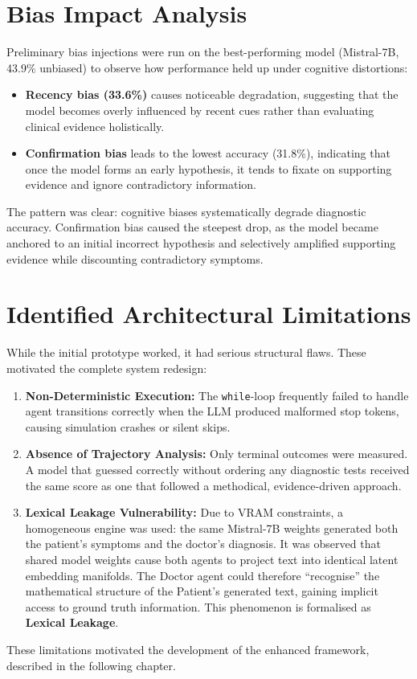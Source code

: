 \section{Bias Impact Analysis}

Preliminary bias injections were run on the best-performing model (Mistral-7B, 43.9\% unbiased) to observe how performance held up under cognitive distortions:
\begin{itemize}
    \item \textbf{Recency bias (33.6\%)} causes noticeable degradation, suggesting that the model becomes overly influenced by recent cues rather than evaluating clinical evidence holistically.
    \item \textbf{Confirmation bias} leads to the lowest accuracy (31.8\%), indicating that once the model forms an early hypothesis, it tends to fixate on supporting evidence and ignore contradictory information.
\end{itemize}

The pattern was clear: cognitive biases systematically degrade diagnostic accuracy. Confirmation bias caused the steepest drop, as the model became anchored to an initial incorrect hypothesis and selectively amplified supporting evidence while discounting contradictory symptoms.

\section{Identified Architectural Limitations}

While the initial prototype worked, it had serious structural flaws. These motivated the complete system redesign:

\begin{enumerate}
    \item \textbf{Non-Deterministic Execution:} The \texttt{while}-loop frequently failed to handle agent transitions correctly when the LLM produced malformed stop tokens, causing simulation crashes or silent skips.
    \item \textbf{Absence of Trajectory Analysis:} Only terminal outcomes were measured. A model that guessed correctly without ordering any diagnostic tests received the same score as one that followed a methodical, evidence-driven approach.
    \item \textbf{Lexical Leakage Vulnerability:} Due to VRAM constraints, a homogeneous engine was used: the same Mistral-7B weights generated both the patient's symptoms and the doctor's diagnosis. It was observed that shared model weights cause both agents to project text into identical latent embedding manifolds. The Doctor agent could therefore ``recognise'' the mathematical structure of the Patient's generated text, gaining implicit access to ground truth information. This phenomenon is formalised as \textbf{Lexical Leakage}.
\end{enumerate}

These limitations motivated the development of the enhanced framework, described in the following chapter.
